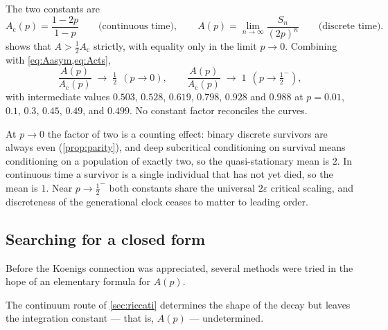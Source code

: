 The two constants are
\begin{equation*}
A_{\text{c}}(p) = \frac{1-2p}{1-p}
\qquad\text{(continuous time)},
\qquad
A(p) = \lim_{n\to\infty}\frac{S_n}{(2p)^n}
\qquad\text{(discrete time)}.
\end{equation*}
 shows that \(A>\tfrac12 A_{\text{c}}\) strictly, with equality only in the limit \(p\to0\). Combining with \cref{eq:Aasym,eq:Acts},
\begin{equation}
\label{eq:ratiolimits}
\frac{A(p)}{A_{\text{c}}(p)} \;\longrightarrow\; \tfrac12 \ \ (p\to0),
\qquad
\frac{A(p)}{A_{\text{c}}(p)} \;\longrightarrow\; 1 \ \ (p\to\tfrac12^-),
\end{equation}
with intermediate values \(0.503\), \(0.528\), \(0.619\), \(0.798\), \(0.928\) and \(0.988\) at
\(p = 0.01\), \(0.1\), \(0.3\), \(0.45\), \(0.49\), and \(0.499\).
No constant factor reconciles the curves.

At \(p\to0\) the factor of two is a counting effect: binary discrete survivors are always even (\cref{prop:parity}), and deep subcritical conditioning on survival means conditioning on a population of exactly two, so the quasi-stationary mean is \(2\). In continuous time a survivor is a single individual that has not yet died, so the mean is \(1\). Near \(p\to\tfrac12^-\) both constants share the universal \(2\varepsilon\) critical scaling, and discreteness of the generational clock ceases to matter to leading order.

\subsection{Searching for a closed form}
\label{sec:GA}

Before the Koenigs connection was appreciated, several methods were tried in the hope of an elementary formula for \(A(p)\).

The continuum route of \cref{sec:riccati} determines the shape of the decay but leaves the integration constant --- that is, \(A(p)\) --- undetermined.

